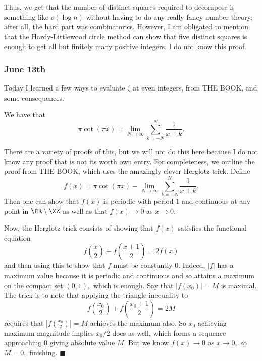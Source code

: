 Thus, we get that the number of distinct squares required to decompose is something like $o(\log n)$ without having to do any really fancy number theory; after all, the hard part was combinatorics. However, I am obligated to mention that the Hardy-Littlewood circle method can show that five distinct squares is enough to get all but finitely many positive integers. I do not know this proof.

\subsubsection{June 13th}
Today I learned a few ways to evaluate $\zeta$ at even integers, from THE BOOK, and some consequences.
\begin{lemma}
    We have that
    \[\pi\cot(\pi x)=\lim_{N\to\infty}\sum_{k=-N}^N\frac1{x+k}.\]
\end{lemma}
There are a variety of proofs of this, but we will not do this here because I do not know any proof that is not its worth own entry. For completeness, we outline the proof from THE BOOK, which uses the amazingly clever Herglotz trick. Define
\[f(x)=\pi\cot(\pi x)-\lim_{N\to\infty}\sum_{k=-N}^N\frac1{x+k}.\]
Then one can show that $f(x)$ is periodic with period $1$ and continuous at any point in $\RR\setminus\ZZ$ as well as that $f(x)\to0$ as $x\to0.$

Now, the Herglotz trick consists of showing that $f(x)$ satisfies the functional equation
\[f\left(\frac x2\right)+f\left(\frac{x+1}2\right)=2f(x)\]
and then using this to show that $f$ must be constantly $0.$ Indeed, $|f|$ has a maximum value because it is periodic and continuous and so attains a maximum on the compact set $(0,1),$ which is enough. Say that $|f(x_0)|=M$ is maximal. The trick is to note that applying the triangle inequality to
\[f\left(\frac{x_0}2\right)+f\left(\frac{x_0+1}2\right)=2M\]
requires that $\left|f\left(\frac{x_0}2\right)\right|=M$ achieves the maximum also. So $x_0$ achieving maximum magnitude implies $x_0/2$ does as well, which forms a sequence approaching $0$ giving absolute value $M.$ But we know $f(x)\to0$ as $x\to0,$ so $M=0,$ finishing. $\blacksquare$

